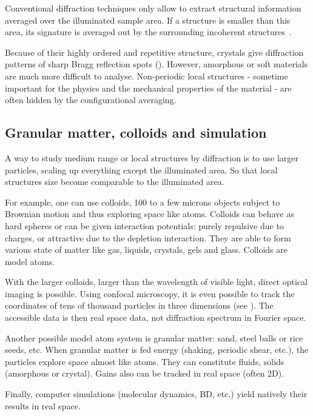 Conventional diffraction techniques only allow to extract structural information averaged over the illuminated sample area. If a structure is smaller than this area, its signature is averaged out by the surrounding incoherent structures~\citep{Wochner2009}.

Because of their highly ordered and repetitive structure, crystals give diffraction patterns of sharp Bragg reflection spots (). However, amorphous or soft materials are much more difficult to analyse. Non-periodic local structures - sometime important for the physics and the mechanical properties of the material - are often hidden by the configurational averaging.

\subsection{Granular matter, colloids and simulation}

A way to study medium range or local structures by diffraction is to use larger particles, scaling up everything except the illuminated area. So that local structures size become comparable to the illuminated area.

For example, one can use colloids,  \unit{100}{\nano\meter} to a few microns objects subject to Brownian motion and thus exploring space like atoms. Colloids can behave as hard spheres or can be given interaction potentials: purely repulsive due to charges, or attractive due to the depletion interaction. They are able to form various state of matter like gas, liquids, crystals, gels and glass. Colloids are model atoms.

With the larger colloids, larger than the wavelength of visible light, direct optical imaging is possible. Using confocal microscopy, it is even possible to track the coordinates of tens of thousand particles in three dimensions (see ). The accessible data is then real space data, not diffraction spectrum in Fourier space.

Another possible model atom system is granular matter: sand, steel balls or rice seeds, etc. When granular matter is fed energy (shaking, periodic shear, etc.), the particles explore space almost like atoms. They can constitute fluids, solids (amorphous or crystal). Gains also can be tracked in real space (often 2D).

Finally, computer simulations (molecular dynamics, \acl{BD}, etc.) yield natively their results in real space.

